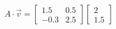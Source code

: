 \documentclass[preview]{standalone}
\begin{document}
\begin{align*}
A \cdot \vec{v} = \begin{bmatrix} 1.5 & 0.5 \\ -0.3 & 2.5 \end{bmatrix} \begin{bmatrix} 2 \\ 1.5 \end{bmatrix}
\end{align*}
\end{document}
